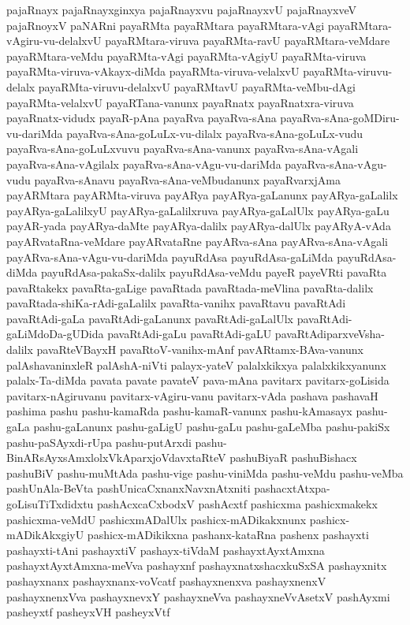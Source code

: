 {pajaRnayx
pajaRnayxginxya
pajaRnayxvu
pajaRnayxvU
pajaRnayxveV
pajaRnoyxV
paNARni
payaRMta
payaRMtara
payaRMtara-vAgi
payaRMtara-vAgiru-vu-delalxvU
payaRMtara-viruva
payaRMta-ravU
payaRMtara-veMdare
payaRMtara-veMdu
payaRMta-vAgi
payaRMta-vAgiyU
payaRMta-viruva
payaRMta-viruva-vAkayx-diMda
payaRMta-viruva-velalxvU
payaRMta-viruvu-delalx
payaRMta-viruvu-delalxvU
payaRMtavU
payaRMta-veMbu-dAgi
payaRMta-velalxvU
payaRTana-vanunx
payaRnatx
payaRnatxra-viruva
payaRnatx-vidudx
payaR-pAna
payaRva
payaRva-sAna
payaRva-sAna-goMDiru-vu-dariMda
payaRva-sAna-goLuLx-vu-dilalx
payaRva-sAna-goLuLx-vudu
payaRva-sAna-goLuLxvuvu
payaRva-sAna-vanunx
payaRva-sAna-vAgali
payaRva-sAna-vAgilalx
payaRva-sAna-vAgu-vu-dariMda
payaRva-sAna-vAgu-vudu
payaRva-sAnavu
payaRva-sAna-veMbudanunx
payaRvarxjAma
payARMtara
payARMta-viruva
payARya
payARya-gaLanunx
payARya-gaLalilx
payARya-gaLalilxyU
payARya-gaLalilxruva
payARya-gaLalUlx
payARya-gaLu
payAR-yada
payARya-daMte
payARya-dalilx
payARya-dalUlx
payARyA-vAda
payARvataRna-veMdare
payARvataRne
payARva-sAna
payARva-sAna-vAgali
payARva-sAna-vAgu-vu-dariMda
payuRdAsa
payuRdAsa-gaLiMda
payuRdAsa-diMda
payuRdAsa-pakaSx-dalilx
payuRdAsa-veMdu
payeR
payeVRti
pavaRta
pavaRtakekx
pavaRta-gaLige
pavaRtada
pavaRtada-meVlina
pavaRta-dalilx
pavaRtada-shiKa-rAdi-gaLalilx
pavaRta-vanihx
pavaRtavu
pavaRtAdi
pavaRtAdi-gaLa
pavaRtAdi-gaLanunx
pavaRtAdi-gaLalUlx
pavaRtAdi-gaLiMdoDa-gUDida
pavaRtAdi-gaLu
pavaRtAdi-gaLU
pavaRtAdiparxveVsha-dalilx
pavaRteVBayxH
pavaRtoV-vanihx-mAnf
pavARtamx-BAva-vanunx
palAshavaninxleR
palAshA-niVti
palayx-yateV
palalxkikxya
palalxkikxyanunx
palalx-Ta-diMda
pavata
pavate
pavateV
pava-mAna
pavitarx
pavitarx-goLisida
pavitarx-nAgiruvanu
pavitarx-vAgiru-vanu
pavitarx-vAda
pashava
pashavaH
pashima
pashu
pashu-kamaRda
pashu-kamaR-vanunx
pashu-kAmasayx
pashu-gaLa
pashu-gaLanunx
pashu-gaLigU
pashu-gaLu
pashu-gaLeMba
pashu-pakiSx
pashu-paSAyxdi-rUpa
pashu-putArxdi
pashu-BinARsAyxsAmxlolxVkAparxjoVdavxtaRteV
pashuBiyaR
pashuBishacx
pashuBiV
pashu-muMtAda
pashu-vige
pashu-viniMda
pashu-veMdu
pashu-veMba
pashUnAla-BeVta
pashUnicaCxnanxNavxnAtxniti
pashacxtAtxpa-goLisuTiTxdidxtu
pashAcxcaCxbodxV
pashAcxtf
pashicxma
pashicxmakekx
pashicxma-veMdU
pashicxmADalUlx
pashicx-mADikakxnunx
pashicx-mADikAkxgiyU
pashicx-mADikikxna
pashanx-kataRna
pashenx
pashayxti
pashayxti-tAni
pashayxtiV
pashayx-tiVdaM
pashayxtAyxtAmxna
pashayxtAyxtAmxna-meVva
pashayxnf
pashayxnatxshacxkuSxSA
pashayxnitx
pashayxnanx
pashayxnanx-voVcatf
pashayxnenxva
pashayxnenxV
pashayxnenxVva
pashayxnevxY
pashayxneVva
pashayxneVvAsetxV
pashAyxmi
pasheyxtf
pasheyxVH
pasheyxVtf
}

